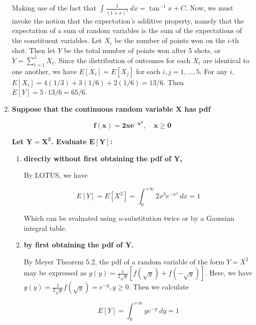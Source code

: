 \documentclass[10pt, oneside]{article}   	%
\theoremstyle{definition}
\begin{document}
\begin{enumerate}[label=7.\arabic*]
  Making use of the fact that $\int \frac{1}{(1+x)^2} \ dx = \tan^{-1} x + C$. Now, we must invoke the notion that the expectation's additive property, namely that the expectation of a sum of random variables is the sum of the expectations of the constituent variables. Let $X_i$ be the number of points won on the $i$-th shot. Then let $Y$ be the total number of points won after 5 shots, or $Y = \sum^5_{i=1} X_i$. Since the distribution of outcomes for each $X_i$ are identical to one another, we have $E[X_i] = E[X_j]$ for each $i, j = 1,...,5$. For any $i$, $E[X_i] = 4(1/3)+3(1/6)+2(1/6) = 13/6$. Then $E[Y] = 5 \cdot 13/6 = \boxed{65/6}$.
  
\item  \begin{tcolorbox}[
  colback=Cerulean!5!white,
  colframe=Cerulean!75!black]
  \textbf{Suppose that the continuous random variable $\bm{X}$ has pdf}
  
  \[ \bm{f(x) = 2xe^{-x^2}, \quad x \geq 0} \]
  
  \textbf{Let $\bm{Y = X^2}$. Evaluate $\bm{E[Y]}$:}
  \end{tcolorbox}
  
	\begin{enumerate}
	\item  \begin{tcolorbox}[
	  colback=Cerulean!5!white,
	  colframe=Cerulean!75!black]
	  \textbf{directly without first obtaining the pdf of $\bm{Y}$,}
	  \end{tcolorbox}
	  
	  By LOTUS, we have
	  
	  \[ E[Y] = E[X^2] = \int^{+\infty}_0 2x^3 e^{-x^2} \ dx = \boxed{1} \] 
	  
	  Which can be evaluated using $u$-substitution twice or by a Gaussian integral table. 
	  
	\item  \begin{tcolorbox}[
	  colback=Cerulean!5!white,
	  colframe=Cerulean!75!black]
	  \textbf{by first obtaining the pdf of $\bm{Y}$.}
	  \end{tcolorbox}
	  
	  By Meyer Theorem 5.2, the pdf of a random variable of the form $Y = X^2$ may be expressed as $g(y) = \frac{1}{2 \sqrt{y}} [f(\sqrt{y}) + f(-\sqrt{y})]$. Here, we have $g(y) = \frac{1}{2 \sqrt{y}} f(\sqrt{y}) = e^{-y}, y \geq 0$. Then we calculate
	  
	  \[ E[Y] = \int^{+\infty}_0 ye^{-y} \ dy = \boxed{1} \]
	\end{enumerate}


\end{enumerate}
\end{document}
